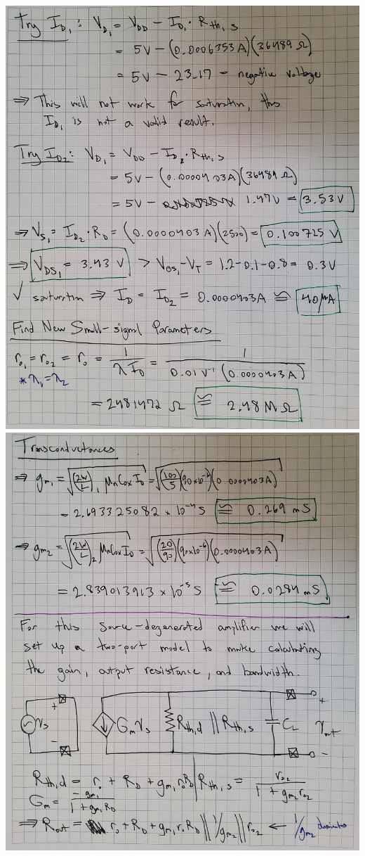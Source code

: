 \documentclass[12pt, fleqn]{article}
\begin{document}
\includegraphics[scale=0.165, angle=90, center]{p1_8.jpg}\\
\newpage
\includegraphics[scale=0.165, angle=90, center]{p1_9.jpg}\\
\end{document}
